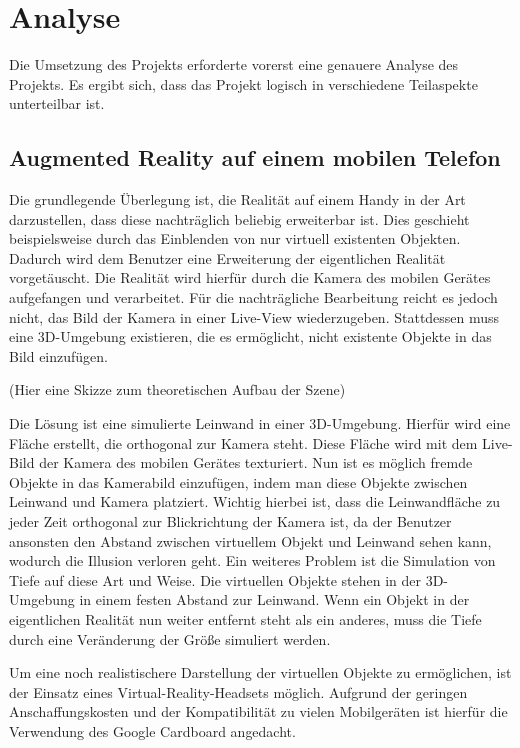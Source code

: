 \chapter{Analyse}
Die Umsetzung des Projekts erforderte vorerst eine genauere Analyse des Projekts. Es ergibt sich, dass das Projekt logisch in verschiedene Teilaspekte unterteilbar ist.

\section{Augmented Reality auf einem mobilen Telefon}
Die grundlegende Überlegung ist, die Realität auf einem Handy in der Art darzustellen, dass diese nachträglich beliebig erweiterbar ist. Dies geschieht beispielsweise durch das Einblenden von nur virtuell existenten Objekten. Dadurch wird dem Benutzer eine Erweiterung der eigentlichen Realität vorgetäuscht.
Die Realität wird hierfür durch die Kamera des mobilen Gerätes aufgefangen und verarbeitet. Für die nachträgliche Bearbeitung reicht es jedoch nicht, das Bild der Kamera in einer Live-View wiederzugeben. Stattdessen muss eine 3D-Umgebung existieren, die es ermöglicht, nicht existente Objekte in das Bild einzufügen.

(Hier eine Skizze zum theoretischen Aufbau der Szene)

Die Lösung ist eine simulierte Leinwand in einer 3D-Umgebung. Hierfür wird eine Fläche erstellt, die orthogonal zur Kamera steht. Diese Fläche wird mit dem Live-Bild der Kamera des mobilen Gerätes texturiert. Nun ist es möglich fremde Objekte in das Kamerabild einzufügen, indem man diese Objekte zwischen Leinwand und Kamera platziert.
Wichtig hierbei ist, dass die Leinwandfläche zu jeder Zeit orthogonal zur Blickrichtung der Kamera ist, da der Benutzer ansonsten den Abstand zwischen virtuellem Objekt und Leinwand sehen kann, wodurch die Illusion verloren geht. Ein weiteres Problem ist die Simulation von Tiefe auf diese Art und Weise. Die virtuellen Objekte stehen in der 3D-Umgebung in einem festen Abstand zur Leinwand. Wenn ein Objekt in der eigentlichen Realität nun weiter entfernt steht als ein anderes, muss die Tiefe durch eine Veränderung der Größe simuliert werden.

Um eine noch realistischere Darstellung der virtuellen Objekte zu ermöglichen, ist der Einsatz eines Virtual-Reality-Headsets möglich. Aufgrund der geringen Anschaffungskosten und der Kompatibilität zu vielen Mobilgeräten ist hierfür die Verwendung des Google Cardboard angedacht.

